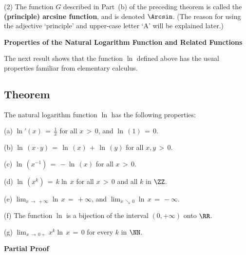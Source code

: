 \V

        (2) The function $G$ described in Part~(b) of the preceding theorem is called the
    {\bf  (principle) arcsine function}, and is denoted ${\Arcsin}$.
(The reason for using the adjective `principle' and upper-case letter `A' will be explained later.)

\VV

        {\bf Properties of the Natural Logarithm Function and Related Functions}

\VV

        The next result shows that the function $\ln$ defined above has the usual properties familiar from elementary calculus.

\V

             \subsection{\small{\bf Theorem}}
            \label{ThmE45.127C}

\V

        The natural logarithm function ${\ln}$ has the following properties:

\V

        (a) ${\ln}'(x) \,=\, {\displaystyle \frac{1}{x}}$ for all $x\,>\,0$, and ${\ln}\,(1) \,=\, 0$.

\V

        (b) ${\ln}\,(x{\cdot}y) \,=\, {\ln}\,(x) \,+\, {\ln}\,(y)$ for all $x,y\,>\,0$.

\V

        (c)  ${\ln}\,(x^{-1}) \,=\, -{\ln}\,(x)$ for all $x\,>\,0$.

\V

        (d) ${\ln}\,(x^{k}) \,=\, k{\ln}\,x$ for all $x\,>\,0$ and all $k$ in ${\ZZ}$.

\V

        (e) $\lim_{x \,{\rightarrow}\, +{\infty}} {\ln}\, x \,=\, +{\infty}$,
    and $\lim_{x \,{\searrow}\, 0} {\ln}\,x \,=\, -{\infty}$.

\V

        (f) The function ${\ln}$ is a bijection of the interval $(0,+{\infty})$ onto ${\RR}$.

\V

        (g) $\lim_{x \,{\rightarrow}\, 0+} x^{k}{\ln}\,x \,=\, 0$ for every $k$ in ${\NN}$.

\V


        {\bf Partial Proof} 

